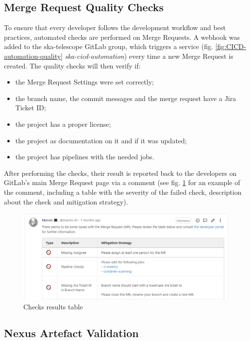 \documentclass[a4paper,
	       keeplastbox,   %
	       References
	       ]{jacow}
\begin{document}
 \subsection{Merge Request Quality Checks}
 
 To ensure that every developer follows the development workflow and best practices, automated checks are performed on Merge Requests. A webhook was added to the ska-telescope GitLab group, which triggers a service (fig. \ref{fig:CICD-automation-quality} \textit{ska-cicd-automation}\cite{ska-cicd-automation}) every time a new Merge Request is created. The quality checks will then verify if:
 
 \begin{itemize}
	\setlength\itemsep{0.1em}
     \item the Merge Request Settings were set correctly;
     \item the branch name, the commit messages and the merge request have a Jira Ticket ID;
     \item the project has a proper license;
     \item the project as documentation on it and if it was updated;
     \item the project has pipelines with the needed jobs.
 \end{itemize}
 
 After performing the checks, their result is reported back to the developers on GitLab's main Merge Request page via a comment (see fig. \ref{fig:marvin-table} for an example of the comment, including a table with the severity of the failed check, description about the check and mitigation strategy).

 \begin{figure}[!htb]
    \centering
    \includegraphics*[width=0.8\columnwidth]{marvin-table}
    \caption{Checks results table}
    \label{fig:marvin-table}
 \end{figure}
 

\subsection{Nexus Artefact Validation}
\end{document}
